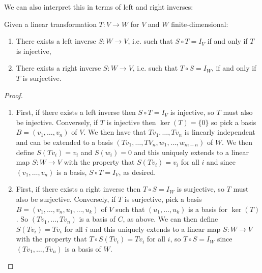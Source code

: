 \documentclass[../linear_algebra_and_groups.tex]{subfiles}
\begin{document}
We can also interpret this in terms of left and right inverses:

\begin{proposition}
\label{prop:inversesleftright}
    \begin{shaded*}
        Given a linear transformation $T:V\to W$ for $V$ and $W$ finite-dimensional:
        \begin{enumerate}
            \item[1.] There exists a left inverse $S:W\to V$, i.e. such that $S\circ T=I_V$ if and only if $T$ is injective,
            \item[2.] There exists a right inverse $S:W\to V$, i.e. such that $T\circ S=I_W$, if and only if $T$ is surjective.
        \end{enumerate}
    \end{shaded*}
\end{proposition}
\begin{proof}
    \begin{enumerate}
        \item[1.] First, if there exists a left inverse then $S\circ T=I_V$ is injective, so $T$ must also be injective. Conversely, if $T$ is injective then $\ker(T)=\{0\}$ so pick a basis $B=(v_1,\dots,v_n)$ of $V$. We then have that $Tv_1,\dots,Tv_n$ is linearly independent and can be extended to a basis $(Tv_1,\dots,TV_n,w_1,\dots,w_{m-n})$ of $W$. We then define $S(Tv_i)=v_i$ and $S(w_i)=0$ and this uniquely extends to a linear map $S:W\to V$ with the property that $S(Tv_i)=v_i$ for all $i$ and since $(v_1,\dots,v_n)$ is a basis, $S\circ T=I_V$, as desired.
        \item[2.] First, if there exists a right inverse then $T\circ S=I_W$ is surjective, so $T$ must also be surjective. Conversely, if $T$ is surjective, pick a basis $B=(v_1,\dots,v_n,u_1,\dots,u_k)$ of $V$ such that $(u_1,\dots,u_k)$ is a basis for $\ker(T)$. So $(Tv_1,\dots,Tv_n)$ is a basis of $C$, as above. We can then define $S(Tv_i)=Tv_i$ for all $i$ and this uniquely extends to a linear map $S:W\to V$ with the property that $T\circ S(Tv_i)=Tv_i$ for all $i$, so $T\circ S=I_W$ since $(Tv_1,\dots,Tv_n)$ is a basis of $W$. \qedhere
    \end{enumerate}
\end{proof}
\end{document}
